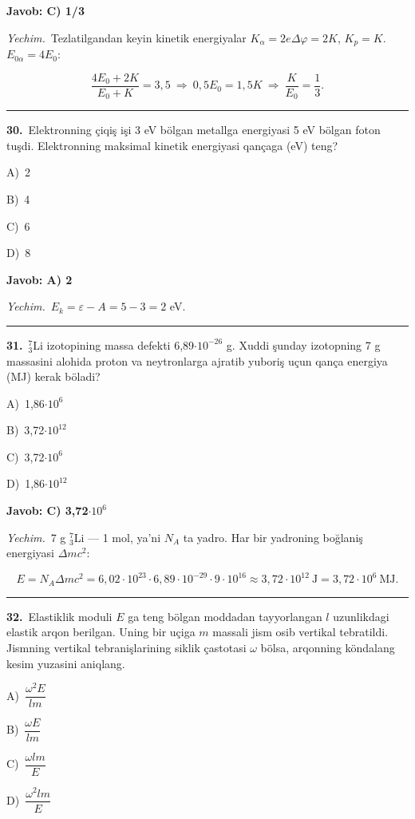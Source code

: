 \documentclass[11pt,a4paper]{article}
\newcommand{\opt}[2]{\hspace*{4mm}#1)\ #2\par}
\begin{document}
\noindent\colorbox{gray!12}{\parbox{\dimexpr\linewidth-2\fboxsep}{\textbf{Javob: C) 1/3}}}\par\smallskip
\noindent\textit{Yechim.}\ Tezlatilgandan keyin kinetik energiyalar $K_\alpha=2e\Delta\varphi=2K$, $K_p=K$. $E_{0\alpha}=4E_0$:\par
\[\frac{4E_0+2K}{E_0+K}=3{,}5\ \Rightarrow\ 0{,}5E_0=1{,}5K\ \Rightarrow\ \frac{K}{E_0}=\frac13.\]\par\medskip\hrule\medskip
{}\noindent\begin{minipage}{\linewidth}
\textbf{30.}\ Elektronning çiqiş işi 3 eV bölgan metallga energiyasi 5 eV bölgan foton tuşdi. Elektronning maksimal kinetik energiyasi qançaga (eV) teng?\par\smallskip
\opt{A}{2}
\opt{B}{4}
\opt{C}{6}
\opt{D}{8}
\end{minipage}\vspace{2pt}\par
\noindent\colorbox{gray!12}{\parbox{\dimexpr\linewidth-2\fboxsep}{\textbf{Javob: A) 2}}}\par\smallskip
\noindent\textit{Yechim.}\ $E_k=\varepsilon-A=5-3=2$ eV.\par\par\medskip\hrule\medskip
{}\noindent\begin{minipage}{\linewidth}
\textbf{31.}\ $^7_3$Li izotopining massa defekti 6,89$\cdot10^{-26}$ g. Xuddi şunday izotopning 7 g massasini alohida proton va neytronlarga ajratib yuboriş uçun qança energiya (MJ) kerak böladi?\par\smallskip
\opt{A}{1,86$\cdot10^{6}$}
\opt{B}{3,72$\cdot10^{12}$}
\opt{C}{3,72$\cdot10^{6}$}
\opt{D}{1,86$\cdot10^{12}$}
\end{minipage}\vspace{2pt}\par
\noindent\colorbox{gray!12}{\parbox{\dimexpr\linewidth-2\fboxsep}{\textbf{Javob: C) 3,72$\cdot10^{6}$}}}\par\smallskip
\noindent\textit{Yechim.}\ 7 g $^7_3$Li — 1 mol, ya’ni $N_A$ ta yadro. Har bir yadroning boğlaniş energiyasi $\Delta mc^2$:\par
\[E=N_A\Delta mc^2=6{,}02\cdot10^{23}\cdot6{,}89\cdot10^{-29}\cdot9\cdot10^{16}\approx3{,}72\cdot10^{12}\ \text{J}=3{,}72\cdot10^6\ \text{MJ}.\]\par\medskip\hrule\medskip
{}\noindent\begin{minipage}{\linewidth}
\textbf{32.}\ Elastiklik moduli $E$ ga teng bölgan moddadan tayyorlangan $l$ uzunlikdagi elastik arqon berilgan. Uning bir uçiga $m$ massali jism osib vertikal tebratildi. Jismning vertikal tebranişlarining siklik çastotasi $\omega$ bölsa, arqonning köndalang kesim yuzasini aniqlang.\par\smallskip
\opt{A}{$\dfrac{\omega^2E}{lm}$}
\opt{B}{$\dfrac{\omega E}{lm}$}
\opt{C}{$\dfrac{\omega lm}{E}$}
\opt{D}{$\dfrac{\omega^2lm}{E}$}
\end{minipage}\vspace{2pt}\par
\end{document}
